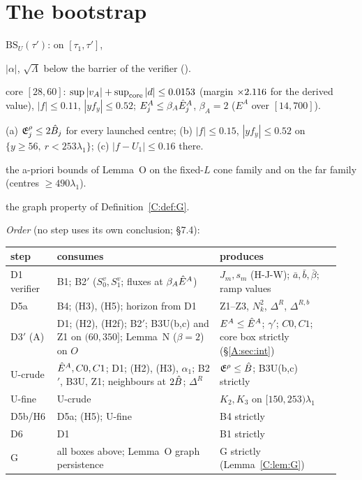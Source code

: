 \documentclass[11pt]{article}
\begin{document}
\section{The bootstrap}\label{M:sec:boot}
\noindent$\mathrm{BS}_U(\tau')$: on $[\tau_1,\tau']$,
\begin{description}[leftmargin=1.2em]
\item[B1] $|\alpha|$, $\sqrt\Lambda$ below the barrier of the verifier ().
\item[B2$'$] core $[28,60]$: $\sup|v_A|+\sup_{\rm core}|d|\le0.0153$ (margin $\times2.116$ for the derived value), $|f|\le0.11$, $|yf_y|\le0.52$; $E^A_j\le\beta_A\hat E^A_j$, $\beta_A=2$ ($E^A$ over $[14,700]$).
\item[B3U] (a) $\mathfrak E^\rho_j\le2\hat B_j$ for every launched centre; (b) $|f|\le0.15$, $|yf_y|\le0.52$ on $\{y\ge56,\ r<253\lambda_1\}$; (c) $|f-U_1|\le0.16$ there.
\item[B4] the a-priori bounds of Lemma~O on the fixed-$L$ cone family and on the far family (centres $\ge490\lambda_1$).
\item[G] the graph property of Definition~\ref{C:def:G}.
\end{description}
\noindent\emph{Order} (no step uses its own conclusion;  \S7.4):
\begin{center}\small\begin{tabular}{@{}p{0.12\linewidth}p{0.47\linewidth}p{0.35\linewidth}@{}}\toprule
step & consumes & produces\\\midrule
D1 verifier & B1; B2$'$ ($S^v_0,S^v_1$; fluxes at $\beta_A\hat E^A$) & $J_m,s_m$ (H-J-W); $\bar a,\bar b,\bar\beta$; ramp values\\
D5a & B4; (H3), (H5); horizon from D1 & Z1--Z3, $N_k^2$, $\Delta^R$, $\Delta^{R,b}$\\
D3$'$ (A) & D1; (H2), (H2f); B2$'$; B3U(b,c) and Z1 on $(60,350]$; Lemma~N ($\beta=2$) on $O$ & $E^A\le\hat E^A$; $\gamma'$; $C0,C1$; core box strictly (\S\ref{A:sec:int})\\
U-crude & $\hat E^A,C0,C1$; D1; (H2), (H3), $\alpha_1$; B2$'$, B3U, Z1; neighbours at $2\hat B$; $\Delta^R$ & $\mathfrak E^\rho\le\hat B$; B3U(b,c) strictly\\
U-fine & U-crude & $K_2,K_3$ on $[150,253)\lambda_1$\\
D5b/H6 & D5a; (H5); U-fine & B4 strictly\\
D6 & D1 & B1 strictly\\
G & all boxes above; Lemma~O graph persistence & G strictly (Lemma~\ref{C:lem:G})\\\bottomrule\end{tabular}\end{center}
\end{document}
